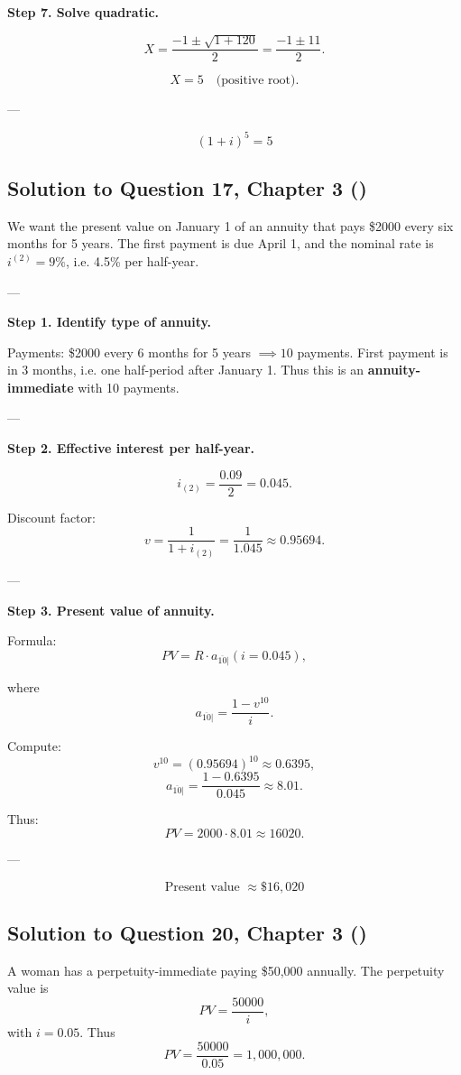 \documentclass[12pt, a4paper]{article}
\begin{document}
\textbf{Step 7. Solve quadratic.}

\[
X = \frac{-1 \pm \sqrt{1+120}}{2} = \frac{-1 \pm 11}{2}.
\]

\[
X = 5 \quad \text{(positive root)}.
\]

---

\[
\boxed{(1+i)^5 = 5}
\]

\subsection*{Solution to Question 17, Chapter 3 (\cite{toi3rd})}

We want the present value on January 1 of an annuity that pays \$2000 every six months for 5 years.  
The first payment is due April 1, and the nominal rate is $i^{(2)} = 9\%$, i.e. 4.5\% per half-year.

---

\textbf{Step 1. Identify type of annuity.}

Payments: \$2000 every 6 months for 5 years $\implies 10$ payments.  
First payment is in 3 months, i.e. one half-period after January 1.  
Thus this is an \textbf{annuity-immediate} with 10 payments.

---

\textbf{Step 2. Effective interest per half-year.}

\[
i_{(2)} = \frac{0.09}{2} = 0.045.
\]

Discount factor:
\[
v = \frac{1}{1+i_{(2)}} = \frac{1}{1.045} \approx 0.95694.
\]

---

\textbf{Step 3. Present value of annuity.}

Formula:
\[
PV = R \cdot a_{\overline{10}|}(i=0.045),
\]

where
\[
a_{\overline{10}|} = \frac{1-v^{10}}{i}.
\]

Compute:
\[
v^{10} = (0.95694)^{10} \approx 0.6395,
\]
\[
a_{\overline{10}|} = \frac{1-0.6395}{0.045} \approx 8.01.
\]

Thus:
\[
PV = 2000 \cdot 8.01 \approx 16020.
\]

---

\[
\boxed{\text{Present value } \approx \$16{,}020}
\]

\subsection*{Solution to Question 20, Chapter 3 (\cite{toi3rd})}

A woman has a perpetuity-immediate paying \$50{,}000 annually.  
The perpetuity value is
\[
PV = \frac{50000}{i},
\]
with $i=0.05$.  
Thus
\[
PV = \frac{50000}{0.05} = 1{,}000{,}000.
\]
\end{document}
